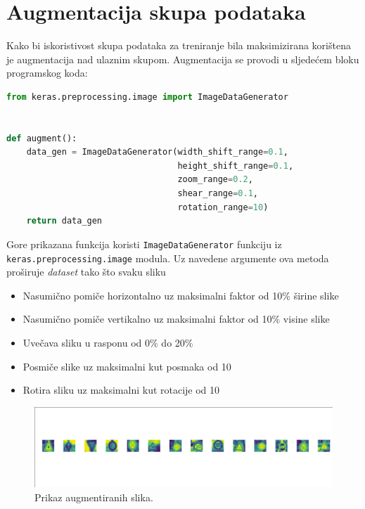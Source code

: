 \documentclass[times, utf8, zavrsni]{fer}
\newcommand{\code}[1]{\colorbox{light-gray}{\texttt{#1}}}
\begin{document}
\section{Augmentacija skupa podataka}
Kako bi iskoristivost skupa podataka za treniranje bila maksimizirana korištena je augmentacija nad ulaznim skupom.
Augmentacija se provodi u sljedećem bloku programskog koda:
\\
\begin{lstlisting}[language=Python]
from keras.preprocessing.image import ImageDataGenerator


def augment():
    data_gen = ImageDataGenerator(width_shift_range=0.1,
                                  height_shift_range=0.1,
                                  zoom_range=0.2,
                                  shear_range=0.1,
                                  rotation_range=10)
    return data_gen
\end{lstlisting}

Gore prikazana funkcija koristi \code{ImageDataGenerator} funkciju iz
\\
\code{keras.preprocessing.image} modula. Uz navedene argumente ova metoda proširuje \emph{dataset} tako što svaku sliku
\begin{itemize}
	\item  Nasumično pomiče horizontalno uz maksimalni faktor od 10\% širine slike
	\item  Nasumično pomiče vertikalno uz maksimalni faktor od 10\% visine slike
	\item Uvečava sliku u rasponu od 0\% do 20\%
	\item  Posmiče slike uz maksimalni kut posmaka od 10\textdegree 
	\item  Rotira sliku uz maksimalni kut rotacije od 10\textdegree
\end{itemize}
\begin{figure}[h!]
  \includegraphics[width=\linewidth,trim=4 4 4 4,clip]{images/image-augmentation.jpeg}
  \caption{Prikaz augmentiranih slika.}
\end{figure}
\end{document}

